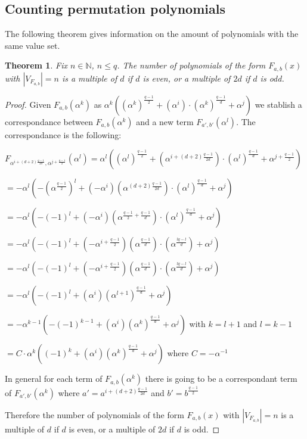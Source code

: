 \documentclass{article}
\newtheorem{theorem}{Theorem}[section]
\theoremstyle{definition}
\theoremstyle{remark}
\numberwithin{equation}{section}
\begin{document}
\subsection{Counting permutation polynomials}

 The following theorem gives information on the amount of polynomials with the same value set.

    \begin{theorem}\label{el_teorema}
        Fix $n \in \mathbb{N}$, $n \leq q$. The number of polynomials of the form $F_{a,b}(x)$ with $\left\vert V_{F_{a,b}} \right\vert = n$ is a multiple of $d$ if $d$ is even, or a multiple of $2d$ if $d$ is odd.
    \end{theorem}

    \begin{proof}
      Given $F_{a,b}(\alpha^{k})$ as $\alpha^k((\alpha^k)^{\frac{q-1}{2}}+(\alpha^{i})\cdot(\alpha^k)^{\frac{q-1}{d}}+\alpha^{j})$ we stablish a correspondance between $F_{a,b}(\alpha^{k})$ and a new term $F_{a',b'}(\alpha^{l})$. The correspondance is the following:

      $F_{\alpha^{i+(d+2)\frac{q-1}{2d}},\alpha^{j+\frac{q-1}{2}}}(\alpha^{l}) = \alpha^l((\alpha^l)^{\frac{q-1}{2}}+(\alpha^{i+(d+2)\frac{q-1}{2d}})\cdot(\alpha^l)^{\frac{q-1}{d}}+\alpha^{j+\frac{q-1}{2}})$

      $= -\alpha^l(-(\alpha^{\frac{q-1}{2}})^l+(-\alpha^{i})(\alpha^{(d+2)\frac{q-1}{2d}})\cdot(\alpha^l)^{\frac{q-1}{d}}+\alpha^{j})$

      $= -\alpha^l(-(-1)^{l}+(-\alpha^{i})(\alpha^{\frac{q-1}{2}+\frac{q-1}{d}})\cdot(\alpha^l)^{\frac{q-1}{d}}+\alpha^{j})$

      $= -\alpha^l(-(-1)^{l}+(-\alpha^{i+\frac{q-1}{2}})(\alpha^{\frac{q-1}{d}})\cdot(\alpha^{\frac{lq-l}{d}})+\alpha^{j})$

      $= -\alpha^l(-(-1)^{l}+(-\alpha^{i+\frac{q-1}{2}})(\alpha^{\frac{q-1}{d}})\cdot(\alpha^{\frac{lq-l}{d}})+\alpha^{j})$

      $= -\alpha^l(-(-1)^{l}+(\alpha^{i})(\alpha^{l+1})^{\frac{q-1}{d}}+\alpha^{j})$

      $= -\alpha^{k-1}(-(-1)^{k-1}+(\alpha^{i})(\alpha^{k})^{\frac{q-1}{d}}+\alpha^{j})$ with $k=l+1$ and $l=k-1$

      $= C \cdot \alpha^{k}((-1)^{k}+(\alpha^{i})(\alpha^{k})^{\frac{q-1}{d}}+\alpha^{j})$ where $C=-\alpha^{-1}$

      In general for each term of $F_{a,b}(\alpha^{k})$ there is going to be a correspondant term of $F_{a',b'}(\alpha^{k})$ where $a' = a^{i+(d+2)\frac{q-1}{2d}}$ and $b'= b^{\frac{q-1}{2}}$

      Therefore the number of polynomials of the form $F_{a,b}(x)$ with $\left\vert V_{F_{a,b}} \right\vert = n$ is a multiple of $d$ if $d$ is even, or a multiple of $2d$ if $d$ is odd.
    \end{proof}
\end{document}

